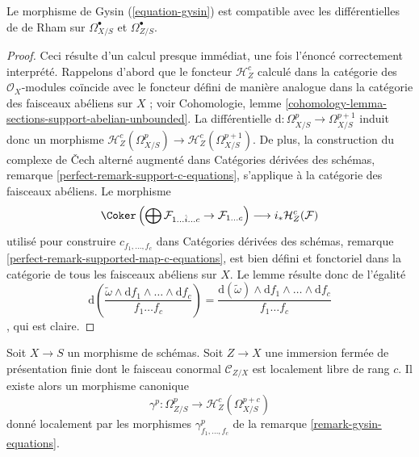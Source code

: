 \begin{lemma}
\label{lemma-gysin-differential}
Le morphisme de Gysin (\ref{equation-gysin}) est compatible avec les différentielles de de Rham
sur $\Omega^\bullet_{X/S}$ et $\Omega^\bullet_{Z/S}$.
\end{lemma}

\begin{proof}
Ceci résulte d'un calcul presque immédiat, une fois l'énoncé correctement interprété.
Rappelons d'abord que le foncteur
$\mathcal{H}^c_Z$ calculé dans la catégorie des $\mathcal{O}_X$-modules
coïncide avec le foncteur défini de manière analogue dans la catégorie des faisceaux abéliens
sur $X$ ; voir
Cohomologie, lemme \ref{cohomology-lemma-sections-support-abelian-unbounded}.
La différentielle $\text{d} : \Omega^p_{X/S} \to \Omega^{p + 1}_{X/S}$
induit donc un morphisme
$\mathcal{H}^c_Z(\Omega^p_{X/S}) \to \mathcal{H}^c_Z(\Omega^{p + 1}_{X/S})$.
De plus, la construction du complexe de {\v C}ech alterné augmenté dans
Catégories dérivées des schémas, remarque \ref{perfect-remark-support-c-equations},
s'applique à la catégorie des faisceaux abéliens. Le morphisme
$$
\Coker\left(\bigoplus \mathcal{F}_{1 \ldots \hat i \ldots c} \to
\mathcal{F}_{1 \ldots c}\right)
\longrightarrow
i_*\mathcal{H}^c_Z(\mathcal{F})
$$
utilisé pour construire $c_{f_1, \ldots, f_c}$ dans
Catégories dérivées des schémas, remarque
\ref{perfect-remark-supported-map-c-equations},
est bien défini et
fonctoriel dans la catégorie de tous les faisceaux abéliens sur $X$.
Le lemme résulte donc de l'égalité
$$
\text{d}\left(
\frac{\tilde \omega \wedge \text{d}f_1 \wedge \ldots \wedge
\text{d}f_c}{f_1 \ldots f_c}\right) =
\frac{\text{d}(\tilde \omega) \wedge
\text{d}f_1 \wedge \ldots \wedge \text{d}f_c}{f_1 \ldots f_c}
$$,
qui est claire.
\end{proof}

\begin{lemma}
\label{lemma-gysin-global}
Soit $X \to S$ un morphisme de schémas. Soit $Z \to X$ une immersion fermée
de présentation finie dont le faisceau conormal $\mathcal{C}_{Z/X}$ est
localement libre de rang $c$. Il existe alors un morphisme canonique
$$
\gamma^p : \Omega^p_{Z/S} \to \mathcal{H}^c_Z(\Omega^{p + c}_{X/S})
$$
donné localement par les morphismes $\gamma^p_{f_1, \ldots, f_c}$
de la remarque \ref{remark-gysin-equations}.
\end{lemma}

